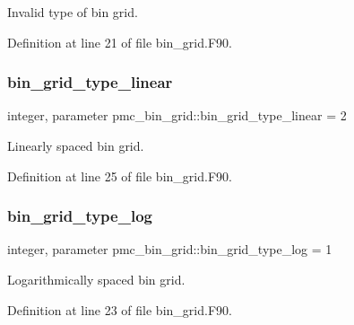 Invalid type of bin grid. 



Definition at line 21 of file bin\+\_\+grid.\+F90.

\mbox{\label{namespacepmc__bin__grid_ae02a160719a835f7ee0c048539c257cd}} 
\subsubsection{\texorpdfstring{bin\+\_\+grid\+\_\+type\+\_\+linear}{bin\_grid\_type\_linear}}
{\footnotesize\ttfamily integer, parameter pmc\+\_\+bin\+\_\+grid\+::bin\+\_\+grid\+\_\+type\+\_\+linear = 2}



Linearly spaced bin grid. 



Definition at line 25 of file bin\+\_\+grid.\+F90.

\mbox{\label{namespacepmc__bin__grid_a2132d94b8aad57a55efc8f8356690148}} 
\subsubsection{\texorpdfstring{bin\+\_\+grid\+\_\+type\+\_\+log}{bin\_grid\_type\_log}}
{\footnotesize\ttfamily integer, parameter pmc\+\_\+bin\+\_\+grid\+::bin\+\_\+grid\+\_\+type\+\_\+log = 1}



Logarithmically spaced bin grid. 



Definition at line 23 of file bin\+\_\+grid.\+F90.

